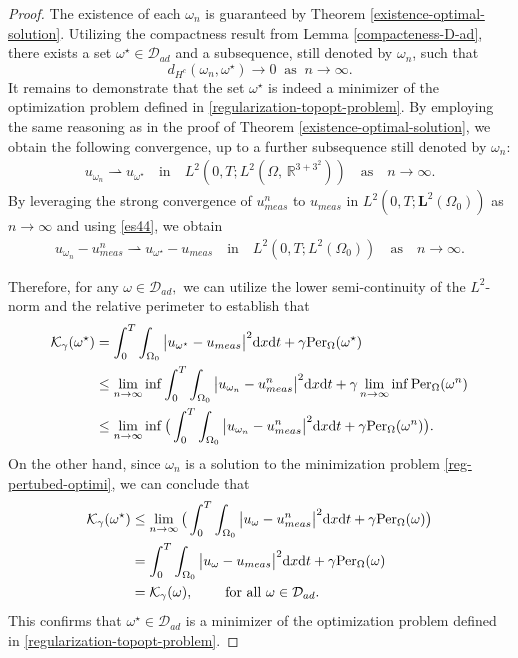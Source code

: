 \documentclass[10pt,a4paper]{amsart}
\def\L{\textbf{L}}
\newcommand{\dt} {\displaystyle\mathrm{d}t}
\newcommand{\dx} {\displaystyle\mathrm{d}x}
\begin{document}
\begin{proof}
The existence of each $\omega_n$ is guaranteed by Theorem \ref{existence-optimal-solution}. Utilizing the compactness result from Lemma \ref{compacteness-D-ad}, there exists a set $\omega^\star\in\mathcal{D}_{ad}$ and a subsequence, still denoted by $\omega_n$, such that
$$d_{H^c}(\omega_n,\omega^\star)\longrightarrow0\;\; \text{as}\;\; n\longrightarrow\infty.$$
It remains to demonstrate that the set $\omega^\star$ is indeed a minimizer of the optimization problem defined in \eqref{regularization-topopt-problem}. By employing the same reasoning as in the proof of Theorem \ref{existence-optimal-solution}, we obtain the following convergence, up to a further subsequence still denoted by $\omega_n$:
\begin{align}\label{es44} u_{\omega_n} \rightharpoonup  u_{\omega^\star} \quad \text{in} \quad L^2(0,T; L^2(\Omega,\,\mathbb{R}^{3+3^2})) \quad \text{as} \quad n \longrightarrow \infty. \end{align}
 By leveraging the strong convergence of $u_{meas}^n$ to $u_{meas}$ in $L^2(0,T;\L^2(\Omega_0))$ as $n\longrightarrow \infty$ and using \eqref{es44}, we obtain
 \begin{align*}
u_{\omega_n}-u_{meas}^n \rightharpoonup  u_{\omega^\star}-u_{meas} \quad \text{in} \quad L^2(0,T; L^2(\Omega_0)) \quad \text{as} \quad n \longrightarrow \infty.
\end{align*}


\noindent Therefore, for any $\omega\in\mathcal{D}_{ad},$ we can utilize the lower semi-continuity of the $L^2$-norm and the relative perimeter to establish that
\begin{align*}
\mathcal{K}_\gamma(\omega^\star)&=\int_0^T\int_{\Omega_0}\big|u_{\omega^\star}-
u_{meas}\big|^2\dx\dt+\gamma\hbox{Per}_\Omega(\omega^\star)\\
&\leq\lim_{n\rightarrow\infty}\inf\int_0^T\int_{\Omega_0}\big|u_{\omega_n}-
u_{meas}^n\big|^2\dx\dt+\gamma\lim_{n\rightarrow\infty}\inf\hbox{Per}_\Omega(\omega^n)\\
&\leq\lim_{n\rightarrow\infty}\inf\big(\int_0^T\int_{\Omega_0}\big|u_{\omega_n}-
u_{meas}^n\big|^2\dx\dt+\gamma\hbox{Per}_\Omega(\omega^n)\big).
\end{align*}
On the other hand, since $\omega_n$ is a solution to the minimization problem \eqref{reg-pertubed-optimi}, we can conclude that
\begin{align*}
\mathcal{K}_\gamma(\omega^\star)&\leq\lim_{n\rightarrow\infty}\big(\int_0^T\int_{\Omega_0}\big|u_{\omega}-
u_{meas}^n\big|^2\dx\dt+\gamma\hbox{Per}_\Omega(\omega)\big)\\
&=\int_0^T\int_{\Omega_0}\big|u_{\omega}-
u_{meas}\big|^2\dx\dt+\gamma\hbox{Per}_\Omega(\omega)\\
&=\mathcal{K}_\gamma(\omega), \qquad \;\text{for all }
\omega\in\mathcal{D}_{ad}.
\end{align*}
This confirms that $\omega^\star\in\mathcal{D}_{ad}$ is a minimizer of the optimization problem defined in \eqref{regularization-topopt-problem}.
\end{proof}
\end{document}
